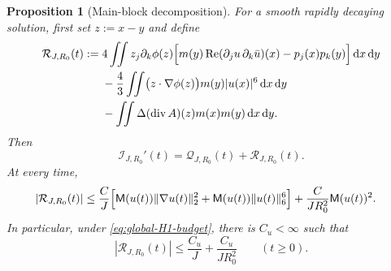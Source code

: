 \documentclass{interact}
\numberwithin{equation}{section}
\theoremstyle{plain}
\newtheorem{proposition}[theorem]{Proposition}
\theoremstyle{definition}
\theoremstyle{remark}
\newcommand{\Rea}{\operatorname{Re}}
\newcommand{\M}{\mathsf M}
\newcommand{\dd}{\,\mathrm d}
\begin{document}
\begin{proposition}[Main-block decomposition]\label{prop:Q-remainder}
For a smooth rapidly decaying solution, first set $z:=x-y$ and define
\begin{align}
 \mathcal R_{J,R_0}(t)
 :={}&4\iint z_j\partial_k\phi(z)
 \Bigl[
 m(y)\Rea(\partial_ju\,\partial_k\bar u)(x)
 -p_j(x)p_k(y)
 \Bigr]\dd x\dd y
 \notag\\
 &-\frac43\iint
 \bigl(z\cdot\nabla\phi(z)\bigr)m(y)|u(x)|^6\dd x\dd y
 \notag\\
 &-\iint
 \Delta(\operatorname{div}A)(z)m(x)m(y)\dd x\dd y.
 \label{eq:R-explicit}
\end{align}
Then
\begin{equation}\label{eq:I-Q-R}
 \mathcal I_{J,R_0}'(t)
 =\mathcal Q_{J,R_0}(t)+\mathcal R_{J,R_0}(t).
\end{equation}
At every time,
\begin{align}
 |\mathcal R_{J,R_0}(t)|
 &\le \frac{C}{J}\Bigl[
 \M(u(t))\|\nabla u(t)\|_2^2
 +\M(u(t))\|u(t)\|_6^6\Bigr]
 +\frac{C}{JR_0^2}\M(u(t))^2.
 \label{eq:R-bound-explicit}
\end{align}
In particular, under \eqref{eq:global-H1-budget}, there is $C_u<\infty$ such that
\begin{equation}\label{eq:R-bound}
 |\mathcal R_{J,R_0}(t)|
 \le\frac{C_u}{J}+\frac{C_u}{JR_0^2}
 \qquad(t\ge0).
\end{equation}
\end{proposition}
\end{document}
